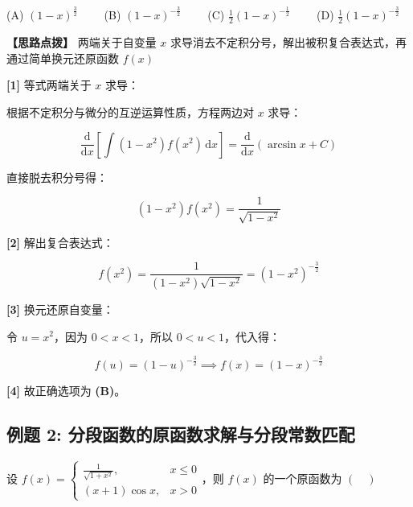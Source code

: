 \documentclass[11pt,a4paper,UTF8]{ctexart}
\begin{document}
(A) $(1-x)^{\frac{3}{2}} \qquad$ (B) $(1-x)^{-\frac{3}{2}} \qquad$ (C) $\frac{1}{2}(1-x)^{-\frac{1}{2}} \qquad$ (D) $\frac{1}{2}(1-x)^{-\frac{3}{2}}$

\textbf{\color{DeepPurple}【思路点拨】} 两端关于自变量 $x$ 求导消去不定积分号，解出被积复合表达式，再通过简单换元还原函数 $f(x)$


\begin{solbox}[分步推导与答题规范]
\textbf{[1]} 等式两端关于 $x$ 求导：

根据不定积分与微分的互逆运算性质，方程两边对 $x$ 求导：


\begin{equation*}
\frac{\mathrm{d}}{\mathrm{d}x}\left[ \int (1-x^2)f(x^2)\,\mathrm{d}x \right] = \frac{\mathrm{d}}{\mathrm{d}x}(\arcsin x + C)
\end{equation*}


直接脱去积分号得：


\begin{equation*}
(1-x^2)f(x^2) = \frac{1}{\sqrt{1-x^2}}
\end{equation*}


\textbf{[2]} 解出复合表达式：


\begin{equation*}
f(x^2) = \frac{1}{(1-x^2)\sqrt{1-x^2}} = (1-x^2)^{-\frac{3}{2}}
\end{equation*}


\textbf{[3]} 换元还原自变量：

令 $u = x^2$，因为 $0 < x < 1$，所以 $0 < u < 1$，代入得：


\begin{equation*}
f(u) = (1-u)^{-\frac{3}{2}} \implies f(x) = (1-x)^{-\frac{3}{2}}
\end{equation*}


\textbf{[4]} 故正确选项为 \textbf{(B)}。
\end{solbox}


\subsection{例题 2: 分段函数的原函数求解与分段常数匹配}

设 $f(x) = \begin{cases} \frac{1}{\sqrt{1+x^2}}, & x \leqslant 0 \\ (x+1)\cos x, & x > 0 \end{cases}$，则 $f(x)$ 的一个原函数为 $(\quad)$
\end{document}
